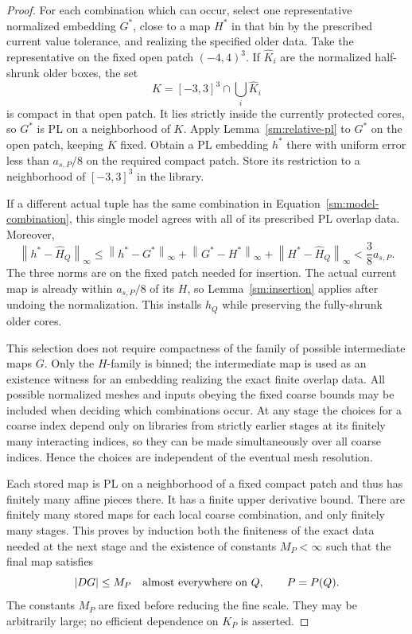 \documentclass[11pt]{article}
\numberwithin{equation}{section}
\theoremstyle{definition}
\theoremstyle{remark}
\newcommand{\norm}[1]{\left\lVert #1\right\rVert}
\begin{document}
\begin{proof}
For each combination which can occur, select one
representative normalized embedding $G^*$, close
to a map $H^*$ in that bin by the prescribed
current value tolerance, and realizing the
specified older data.  Take the representative
on the fixed open patch $(-4,4)^3$.  If
$\widehat K_i$ are the normalized half-shrunk
older boxes, the set
\[
 K=[-3,3]^3\cap\bigcup_i\widehat K_i
\]
is compact in that open patch.  It lies
strictly inside the currently protected
cores, so $G^*$ is PL on a neighborhood of
$K$.  Apply Lemma~\ref{sm:relative-pl} to
$G^*$ on the open patch, keeping $K$ fixed.
Obtain a PL embedding $h^*$ there with
uniform error less than $a_{s,P}/8$ on the
required compact patch.  Store its restriction
to a neighborhood of $[-3,3]^3$ in the library.

If a different actual tuple has the same
combination in Equation~\eqref{sm:model-combination}, this
single model agrees with all of its prescribed
PL overlap data.  Moreover,
\begin{equation}
 \label{sm:reuse-error}
 \norm{h^*-\widehat H_Q}_{\infty}
 \le \norm{h^*-G^*}_{\infty}
     +\norm{G^*-H^*}_{\infty}
     +\norm{H^*-\widehat H_Q}_{\infty}
 <\frac38 a_{s,P}.
\end{equation}
The three norms are on the fixed patch needed
for insertion.  The actual current map is
already within $a_{s,P}/8$ of its $H$, so
Lemma~\ref{sm:insertion} applies after undoing
the normalization.  This installs $h_Q$ while
preserving the fully-shrunk older cores.

This selection does not require compactness of
the family of possible intermediate maps $G$.
Only the $H$-family is binned; the intermediate
map is used as an existence witness for an
embedding realizing the exact finite overlap
data.  All possible normalized meshes and
inputs obeying the fixed coarse bounds may
be included when deciding which combinations
occur.  At any stage the choices for a coarse
index depend only on libraries from strictly
earlier stages at its finitely many interacting
indices, so they can be made simultaneously
over all coarse indices.  Hence the choices are independent of
the eventual mesh resolution.

Each stored map is PL on a neighborhood of a
fixed compact patch and thus has finitely many
affine pieces there.  It has a finite upper
derivative bound.  There are finitely many
stored maps for each local coarse combination,
and only finitely many stages.  This proves by
induction both the finiteness of the exact data
needed at the next stage and the existence of
constants $M_P<\infty$ such that the final map
satisfies
\begin{equation}
 \label{sm:model-derivative-bound}
 |DG|\le M_P\quad\hbox{almost everywhere on }Q,
 \qquad P=P(Q).
\end{equation}
The constants $M_P$ are fixed before reducing
the fine scale.  They may be arbitrarily large;
no efficient dependence on $K_P$ is asserted.


\end{proof}
\end{document}
